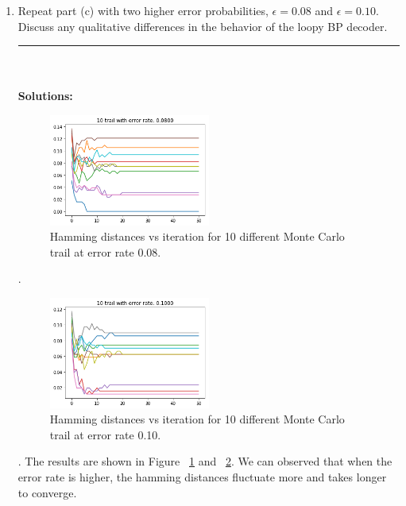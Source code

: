 \documentclass{article}
\begin{document}
\begin{enumerate}
\begin{enumerate}
\pagebreak
\item Repeat part (c) with two higher error probabilities, $\epsilon = 0.08$ and $\epsilon = 0.10$. Discuss any qualitative differences in the behavior of the loopy BP decoder.
\\
\noindent\rule{14cm}{2pt}
\\
\\
\textbf{Solutions:}
\\
\begin{figure}
\includegraphics[width=0.5\textwidth]{p3-ptd-1.png}
\centering
\caption{Hamming distances vs iteration for 10 different Monte Carlo trail at error rate 0.08.}
\label{fig:p3-ptd-1}
\end{figure}.
\begin{figure}
\includegraphics[width=0.5\textwidth]{p3-ptd-2.png}
\centering
\caption{Hamming distances vs iteration for 10 different Monte Carlo trail at error rate 0.10.}
\label{fig:p3-ptd-2}
\end{figure}.
The results are shown in Figure ~\ref{fig:p3-ptd-1} and ~\ref{fig:p3-ptd-2}. We can observed that when the error rate is higher, the hamming distances fluctuate more and takes longer to converge.


\end{enumerate}
\end{enumerate}
\end{document}
